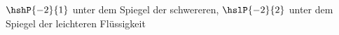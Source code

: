 $\hshP{-2}{1}$ unter dem Spiegel der schwereren, $\hslP{-2}{2}$ unter dem Spiegel der leichteren Flüssigkeit
